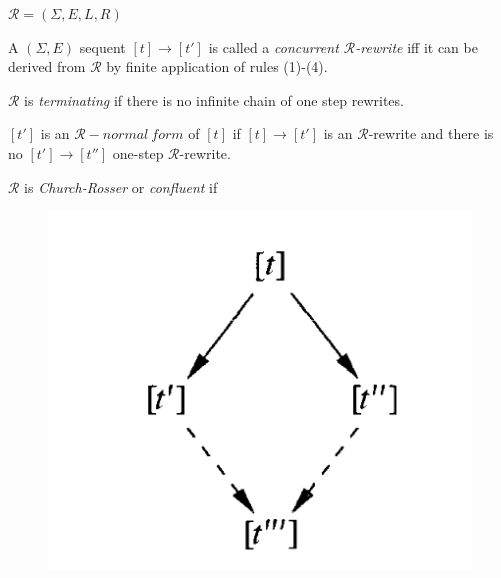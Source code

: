 \documentclass{beamer}
\begin{document}
\begin{frame}
    $\mathcal{R} = (\Sigma, E, L, R)$
    \small
    
    \pause
    \medskip
    A $(\Sigma, E)$ sequent $[t] \rightarrow [t']$ is called  a \emph{concurrent $\mathcal{R}$-rewrite} iff it can be derived from $\mathcal{R}$ by finite application   of rules (1)-(4).
    
   
    \medskip
    $\mathcal{R}$ is \emph{terminating} if there is no infinite chain of one step rewrites.

    \medskip
    $[t']$ is an $\mathcal{R}-normal\ form$ of $[t]$ if $[t] \rightarrow [t']$ is an 
    $\mathcal{R}$-rewrite and there is no $[t'] \rightarrow [t'']$ one-step  $\mathcal{R}$-rewrite.
    

    
    \medskip
    $\mathcal{R}$ is \emph{Church-Rosser} or \emph{confluent} if
    \begin{figure}
        \includegraphics[scale=0.2]{img/churchrosser.png}
    \end{figure}
    
\end{frame}
\end{document}
